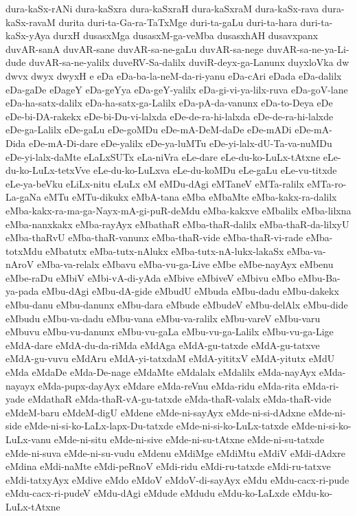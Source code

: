 {dura-kaSx-rANi
dura-kaSxra
dura-kaSxraH
dura-kaSxraM
dura-kaSx-rava
dura-kaSx-ravaM
durita
duri-ta-Ga-ra-TaTxMge
duri-ta-gaLu
duri-ta-hara
duri-ta-kaSx-yAya
durxH
dusasxMga
dusasxM-ga-veMba
dusasxhAH
dusavxpanx
duvAR-sanA
duvAR-sane
duvAR-sa-ne-gaLu
duvAR-sa-nege
duvAR-sa-ne-ya-Li-dude
duvAR-sa-ne-yalilx
duveRV-Sa-dalilx
duviR-deyx-ga-Lanunx
duyxloVka
dw
dwvx
dwyx
dwyxH
e
eDa
eDa-ba-la-neM-da-ri-yanu
eDa-cAri
eDada
eDa-dalilx
eDa-gaDe
eDageY
eDa-geYya
eDa-geY-yalilx
eDa-gi-vi-ya-lilx-ruva
eDa-goV-lane
eDa-ha-satx-dalilx
eDa-ha-satx-ga-Lalilx
eDa-pA-da-vanunx
eDa-to-Deya
eDe
eDe-bi-DA-rakekx
eDe-bi-Du-vi-lalxda
eDe-de-ra-hi-lalxda
eDe-de-ra-hi-lalxde
eDe-ga-Lalilx
eDe-gaLu
eDe-goMDu
eDe-mA-DeM-daDe
eDe-mADi
eDe-mA-Dida
eDe-mA-Di-dare
eDe-yalilx
eDe-ya-luMTu
eDe-yi-lalx-dU-Ta-va-nuMDu
eDe-yi-lalx-daMte
eLaLxSUTx
eLa-niVra
eLe-dare
eLe-du-ko-LuLx-tAtxne
eLe-du-ko-LuLx-tetxVve
eLe-du-ko-LuLxva
eLe-du-koMDu
eLe-gaLu
eLe-vu-titxde
eLe-ya-beVku
eLiLx-nitu
eLuLx
eM
eMDu-dAgi
eMTaneV
eMTa-ralilx
eMTa-ro-La-gaNa
eMTu
eMTu-dikukx
eMbA-tana
eMba
eMbaMte
eMba-kakx-ra-dalilx
eMba-kakx-ra-ma-ga-Nayx-mA-gi-puR-deMdu
eMba-kakxve
eMbalilx
eMba-lilxna
eMba-nanxkakx
eMba-rayAyx
eMbathaR
eMba-thaR-dalilx
eMba-thaR-da-lilxyU
eMba-thaRvU
eMba-thaR-vanunx
eMba-thaR-vide
eMba-thaR-vi-rade
eMba-totxMdu
eMbatutx
eMba-tutx-nAlukx
eMba-tutx-nA-lukx-lakaSx
eMba-va-nAroV
eMba-va-relalx
eMbavu
eMba-vu-ga-Live
eMbe
eMbe-nayAyx
eMbenu
eMbe-raDu
eMbiV
eMbi-vA-di-yAda
eMbive
eMbiveV
eMbivu
eMbo
eMbu-Ba-ya-pada
eMbu-dAgi
eMbu-dA-gide
eMbudU
eMbuda
eMbu-dadu
eMbu-dakekx
eMbu-danu
eMbu-danunx
eMbu-dara
eMbude
eMbudeV
eMbu-delAlx
eMbu-dide
eMbudu
eMbu-va-dadu
eMbu-vana
eMbu-va-ralilx
eMbu-vareV
eMbu-varu
eMbuvu
eMbu-vu-danunx
eMbu-vu-gaLa
eMbu-vu-ga-Lalilx
eMbu-vu-ga-Lige
eMdA-dare
eMdA-du-da-riMda
eMdAga
eMdA-gu-tatxde
eMdA-gu-tatxve
eMdA-gu-vuvu
eMdAru
eMdA-yi-tatxdaM
eMdA-yititxV
eMdA-yitutx
eMdU
eMda
eMdaDe
eMda-De-nage
eMdaMte
eMdalalx
eMdalilx
eMda-nayAyx
eMda-nayayx
eMda-pupx-dayAyx
eMdare
eMda-reVnu
eMda-ridu
eMda-rita
eMda-ri-yade
eMdathaR
eMda-thaR-vA-gu-tatxde
eMda-thaR-valalx
eMda-thaR-vide
eMdeM-baru
eMdeM-digU
eMdene
eMde-ni-sayAyx
eMde-ni-si-dAdxne
eMde-ni-side
eMde-ni-si-ko-LaLx-lapx-Du-tatxde
eMde-ni-si-ko-LuLx-tatxde
eMde-ni-si-ko-LuLx-vanu
eMde-ni-situ
eMde-ni-sive
eMde-ni-su-tAtxne
eMde-ni-su-tatxde
eMde-ni-suva
eMde-ni-su-vudu
eMdenu
eMdiMge
eMdiMtu
eMdiV
eMdi-dAdxre
eMdina
eMdi-naMte
eMdi-peRnoV
eMdi-ridu
eMdi-ru-tatxde
eMdi-ru-tatxve
eMdi-tatxyAyx
eMdive
eMdo
eMdoV
eMdoV-di-sayAyx
eMdu
eMdu-cacx-ri-pude
eMdu-cacx-ri-pudeV
eMdu-dAgi
eMdude
eMdudu
eMdu-ko-LaLxde
eMdu-ko-LuLx-tAtxne
}
